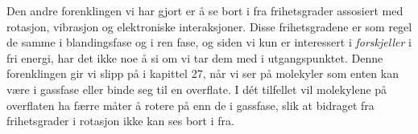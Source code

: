 Den andre forenklingen vi har gjort er å se bort i fra frihetsgrader assosiert med rotasjon, vibrasjon og elektroniske interaksjoner. Disse frihetsgradene er som regel de samme i blandingsfase og i ren fase, og siden vi kun er interessert i \emph{forskjeller} i fri energi, har det ikke noe å si om vi tar dem med i utgangspunktet. Denne forenklingen gir vi slipp på i kapittel 27, når vi ser på molekyler som enten kan være i gassfase eller binde seg til en overflate. I dét tilfellet vil molekylene på overflaten ha færre måter å rotere på enn de i gassfase, slik at bidraget fra frihetsgrader i rotasjon ikke kan ses bort i fra.
